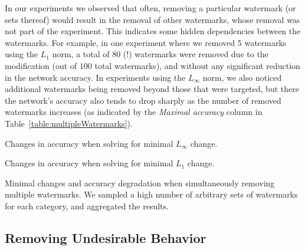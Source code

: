 \documentclass{easychair}
\begin{document}
In our experiments we observed that often, removing a particular
watermark (or sets thereof) would result in the removal of other
watermarks, whose removal was not part of the experiment. This
indicates some hidden dependencies between the watermarks.  For
example, in one experiment where we removed $5$ watermarks using the
$L_1$ norm, a total of $80$ (!) watermarks were removed
due to the modification (out of $100$ total watermarks),
and without any significant reduction in the network accuracy. In
experiments using the
$L_\infty$ norm, we also noticed additional watermarks being removed
beyond those that were targeted, but there the network's accuracy also
tends to drop sharply as the number of removed watermarks increases (as indicated by the
\emph{Maximal accuracy} column in Table~\ref{table:multipleWatermarks}).


\begin{table}
\begin{subtable}{1\textwidth}
\centering
{}
\caption{Changes in accuracy when solving for minimal $L_\infty$ change.}
\end{subtable}
\begin{subtable}{1\textwidth}
\centering
{}
\caption{Changes in accuracy when solving for minimal $L_1$ change.}
\end{subtable}
\caption{Minimal changes and accuracy degradation when simultaneously
  removing multiple watermarks. We sampled a high number of arbitrary
  sets of watermarks for each category, and aggregated the results.}
\label{table:multipleWatermarks}
\end{table}


\subsection{Removing Undesirable Behavior}
\end{document}
